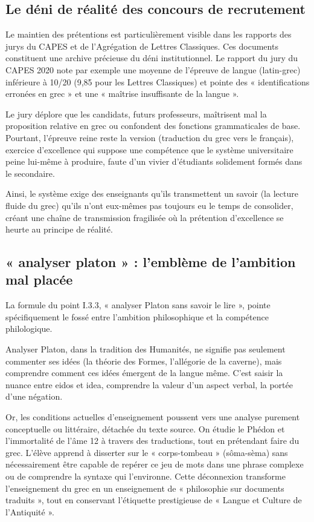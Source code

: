 \subsection{Le déni de réalité des concours de recrutement}

Le maintien des prétentions est particulièrement visible dans les rapports des jurys du CAPES et de
l'Agrégation de Lettres Classiques. Ces documents constituent une archive précieuse du déni
institutionnel. Le rapport du jury du CAPES 2020 note par exemple une moyenne de l'épreuve de langue
(latin-grec) inférieure à 10/20 (9,85 pour les Lettres Classiques) et pointe des « identifications
erronées en grec » et une « maîtrise insuffisante de la langue ».\cite{I-3-3-ref11}

Le jury déplore que les candidats, futurs professeurs, maîtrisent mal la proposition relative en
grec ou confondent des fonctions grammaticales de base.\cite{I-3-3-ref11} Pourtant, l'épreuve reine
reste la version (traduction du grec vers le français), exercice d'excellence qui suppose une
compétence que le système universitaire peine lui-même à produire, faute d'un vivier d'étudiants
solidement formés dans le secondaire.

Ainsi, le système exige des enseignants qu'ils transmettent un savoir (la lecture fluide du grec)
qu'ils n'ont eux-mêmes pas toujours eu le temps de consolider, créant une chaîne de transmission
fragilisée où la prétention d'excellence se heurte au principe de réalité.



\subsection{« analyser platon » : l'emblème de l'ambition mal placée}

La formule du point I.3.3, « analyser Platon sans savoir le lire », pointe spécifiquement le fossé
entre l'ambition philosophique et la compétence philologique.

Analyser Platon, dans la tradition des Humanités, ne signifie pas seulement commenter ses idées (la
théorie des Formes, l'allégorie de la caverne), mais comprendre comment ces idées émergent de la
langue même. C'est saisir la nuance entre eidos et idea, comprendre la valeur d'un aspect verbal, la
portée d'une négation.

Or, les conditions actuelles d'enseignement poussent vers une analyse purement conceptuelle ou
littéraire, détachée du texte source. On étudie le Phédon et l'immortalité de l'âme 12 à travers des
traductions, tout en prétendant faire du grec. L'élève apprend à disserter sur le « corps-tombeau »
(sôma-sèma) sans nécessairement être capable de repérer ce jeu de mots dans une phrase complexe ou
de comprendre la syntaxe qui l'environne. Cette déconnexion transforme l'enseignement du grec en un
enseignement de « philosophie sur documents traduits », tout en conservant l'étiquette prestigieuse
de « Langue et Culture de l'Antiquité ».



